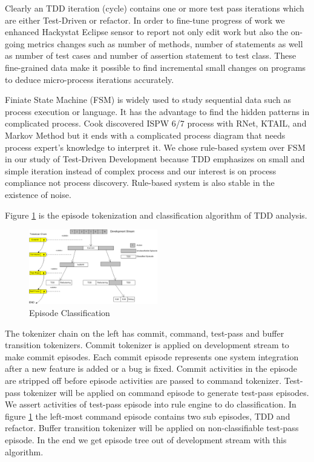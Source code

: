 \documentclass[11pt,twocolumn]{article}
\begin{document}
Clearly an TDD iteration (cycle) contains one or more test pass iterations
which are either Test-Driven or refactor. In order to fine-tune progress of
work we enhanced Hackystat Eclipse sensor to report not only edit work but
also the on-going metrics changes such as number of methods, number of
statements as well as number of test cases and number of assertion
statement to test class. These fine-grained data make it possible to find
incremental small changes on programs to deduce micro-process iterations
accurately.

Finiate State Machine (FSM) is widely used to study sequential data such as
process execution \cite{Cook:95} or language. It has the advantage to find
the hidden patterns in complicated process. Cook discovered ISPW 6/7
process with RNet, KTAIL, and Markov Method \cite{Cook:95} but it ends with
a complicated process diagram that needs process expert's knowledge to
interpret it. We chose rule-based system over FSM in our study of
Test-Driven Development because TDD emphasizes on small and simple
iteration instead of complex process and our interest is on process
compliance not process discovery.  Rule-based system is also stable in the
existence of noise.

Figure \ref{fig:Classification} is the episode tokenization and
classification algorithm of TDD analysis. 
\begin{figure}[ht] 
  \centering
  \includegraphics[width=0.5\textwidth]{picture/Classification.eps}
  \caption{Episode Classification}\label{fig:Classification}
\end{figure} 

The tokenizer chain on the left has commit, command, test-pass and buffer
transition tokenizers. Commit tokenizer is applied on development stream to
make commit episodes. Each commit episode represents one system integration
after a new feature is added or a bug is fixed. Commit activities in the
episode are stripped off before episode activities are passed to command
tokenizer. Test-pass tokenizer will be applied on command episode to
generate test-pass episodes. We assert activities of test-pass episode into
rule engine to do classification. In figure \ref{fig:Classification} the
left-most command episode contains two sub episodes, TDD and refactor.
Buffer transition tokenizer will be applied on non-classifiable test-pass
episode. In the end we get episode tree out of development stream with this
algorithm.
\end{document}
